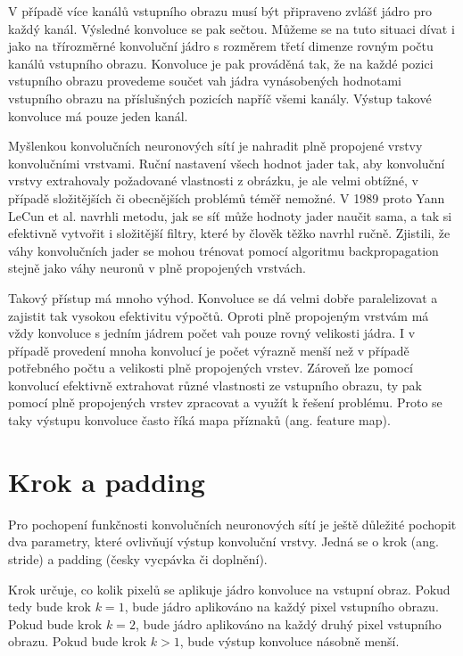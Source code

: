 V případě více kanálů vstupního obrazu musí být připraveno zvlášť jádro pro
každý kanál. Výsledné konvoluce se pak sečtou. Můžeme se na tuto situaci dívat
i jako na třírozměrné konvoluční jádro s rozměrem třetí dimenze rovným počtu
kanálů vstupního obrazu. Konvoluce je pak prováděná tak, že na každé pozici
vstupního obrazu provedeme součet vah jádra vynásobených hodnotami vstupního
obrazu na příslušných pozicích napříč všemi kanály. Výstup takové konvoluce má
pouze jeden kanál.

Myšlenkou konvolučních neuronových sítí je nahradit plně propojené vrstvy
konvolučními vrstvami. Ruční nastavení všech hodnot jader tak, aby konvoluční
vrstvy extrahovaly požadované vlastnosti z obrázku, je ale velmi obtížné, v
případě složitějších či obecnějších problémů téměř nemožné. V 1989 proto Yann
LeCun et al. navrhli metodu, jak se síť může hodnoty jader naučit sama, a tak
si efektivně vytvořit i složitější filtry, které by člověk těžko navrhl ručně.
Zjistili, že váhy konvolučních jader se mohou trénovat pomocí algoritmu
backpropagation stejně jako váhy neuronů v plně propojených vrstvách.

Takový přístup má mnoho výhod. Konvoluce se dá velmi dobře paralelizovat a
zajistit tak vysokou efektivitu výpočtů. Oproti plně propojeným vrstvám má vždy
konvoluce s jedním jádrem počet vah pouze rovný velikosti jádra. I v případě
provedení mnoha konvolucí je počet výrazně menší než v případě potřebného počtu
a velikosti plně propojených vrstev. Zároveň lze pomocí konvolucí efektivně
extrahovat různé vlastnosti ze vstupního obrazu, ty pak pomocí plně propojených
vrstev zpracovat a využít k řešení problému. Proto se taky výstupu konvoluce
často říká mapa příznaků (ang. feature map).

\section{Krok a padding}

Pro pochopení funkčnosti konvolučních neuronových sítí je ještě důležité
pochopit dva parametry, které ovlivňují výstup konvoluční vrstvy. Jedná se o
krok (ang. stride) a padding (česky vycpávka či doplnění).

Krok určuje, co kolik pixelů se aplikuje jádro konvoluce na vstupní obraz.
Pokud tedy bude krok $k = 1$, bude jádro aplikováno na každý pixel vstupního
obrazu. Pokud bude krok $k = 2$, bude jádro aplikováno na každý druhý pixel
vstupního obrazu. Pokud bude krok $k > 1$, bude výstup konvoluce násobně menší.

